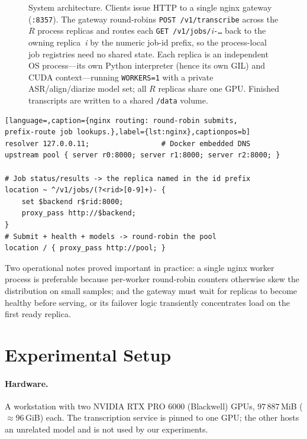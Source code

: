 \documentclass[10pt]{article}
\begin{document}
\begin{figure}[t]
\caption{System architecture. Clients issue HTTP to a single nginx gateway
(\texttt{:8357}). The gateway round-robins \texttt{POST /v1/transcribe} across the
$R$ process replicas and routes each \texttt{GET /v1/jobs/}\textit{i}\texttt{-\dots}
back to the owning replica~\textit{i} by the numeric job-id prefix, so the
process-local job registries need no shared state. Each replica is an independent
OS process---its own Python interpreter (hence its own GIL) and CUDA
context---running \texttt{WORKERS=1} with a private ASR/align/diarize model set;
all $R$ replicas share one GPU. Finished transcripts are written to a shared
\texttt{/data} volume.}
\label{fig:arch}
\end{figure}

\begin{lstlisting}[language=,caption={nginx routing: round-robin submits,
prefix-route job lookups.},label={lst:nginx},captionpos=b]
resolver 127.0.0.11;                 # Docker embedded DNS
upstream pool { server r0:8000; server r1:8000; server r2:8000; }

# Job status/results -> the replica named in the id prefix
location ~ ^/v1/jobs/(?<rid>[0-9]+)- {
    set $backend r$rid:8000;
    proxy_pass http://$backend;
}
# Submit + health + models -> round-robin the pool
location / { proxy_pass http://pool; }
\end{lstlisting}

Two operational notes proved important in practice: a single nginx worker
process is preferable because per-worker round-robin counters otherwise skew the
distribution on small samples; and the gateway must wait for replicas to become
healthy before serving, or its failover logic transiently concentrates load on
the first ready replica.

\section{Experimental Setup}
\label{sec:setup}

\paragraph{Hardware.} A workstation with two NVIDIA RTX PRO 6000 (Blackwell)
GPUs, $97\,887$\,MiB ($\approx 96$\,GiB) each. The transcription service is
pinned to one GPU; the other hosts an unrelated model and is not used by our
experiments.
\end{document}
